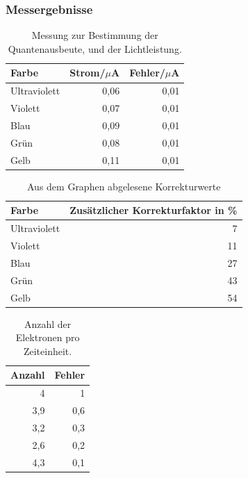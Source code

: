 \documentclass[12px]{scrartcl}
\begin{document}
\subsubsection{Messergebnisse}
\begin{table}[H]
\caption{Messung zur Bestimmung der Quantenausbeute, und der Lichtleistung.}
\begin{center}
\begin{tabular}{|l|r|r|}
\hline
Farbe & \multicolumn{1}{l|}{Strom/$\mu$A} & \multicolumn{1}{l|}{Fehler/$\mu$A} \\ \hline
Ultraviolett & 0,06 & 0,01 \\ \hline
Violett & 0,07 & 0,01 \\ \hline
Blau & 0,09 & 0,01 \\ \hline
Grün & 0,08 & 0,01 \\ \hline
Gelb & 0,11 & 0,01 \\ \hline
\end{tabular}
\end{center}
\label{tab:a_2.3}
\end{table}

\begin{table}[H]
\caption{Aus dem Graphen abgelesene Korrekturwerte}
\begin{center}
\begin{tabular}{|l|r|}
\hline
Farbe & \multicolumn{1}{l|}{Zusätzlicher Korrekturfaktor in \%} \\ \hline
Ultraviolett & 7 \\ \hline
Violett & 11 \\ \hline
Blau & 27 \\ \hline
Grün & 43 \\ \hline
Gelb & 54 \\ \hline
\end{tabular}
\end{center}
\label{tab:a_2_3_k}
\end{table}

\begin{table}[H]
\caption{Anzahl der Elektronen pro Zeiteinheit.}
\begin{center}
\begin{tabular}{|r|r|}
\hline
\multicolumn{1}{|l|}{Anzahl} & \multicolumn{1}{l|}{Fehler} \\ \hline
4 & 1 \\ \hline
3,9 & 0,6 \\ \hline
3,2 & 0,3 \\ \hline
2,6 & 0,2 \\ \hline
4,3 & 0,1 \\ \hline
\end{tabular}
\end{center}
\label{tab:a_2_3_a}
\end{table}
\end{document}
